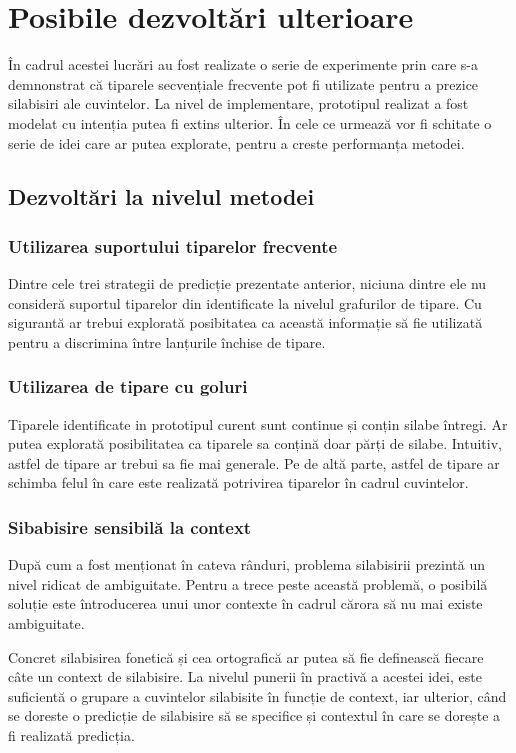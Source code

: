\chapter{Posibile dezvoltări ulterioare}

În cadrul acestei lucrări au fost realizate o serie de experimente prin care s-a demnonstrat că tiparele secvențiale frecvente pot fi utilizate pentru a prezice silabisiri ale cuvintelor. La nivel de implementare, prototipul realizat a fost modelat cu intenția putea fi extins ulterior. În cele ce urmează vor fi schitate o serie de idei care ar putea explorate, pentru a creste performanța metodei.


\section{Dezvoltări la nivelul metodei}

\subsection{Utilizarea suportului tiparelor frecvente}
Dintre cele trei strategii de predicție prezentate anterior, niciuna dintre ele nu consideră suportul tiparelor din identificate la nivelul grafurilor de tipare. Cu sigurantă ar trebui explorată posibitatea ca această informație să fie utilizată pentru a discrimina între lanțurile închise de tipare.

\subsection{Utilizarea de tipare cu goluri}
Tiparele identificate in prototipul curent sunt continue și conțin silabe întregi. Ar putea explorată posibilitatea ca tiparele sa conțină doar părți de silabe. Intuitiv, astfel de tipare ar trebui sa fie mai generale. 
Pe de altă parte, astfel de tipare ar schimba felul în care este realizată potrivirea tiparelor în cadrul cuvintelor.

\subsection{Sibabisire sensibilă la context}
După cum a fost menționat în cateva rânduri, problema silabisirii prezintă un nivel ridicat de ambiguitate. Pentru a trece peste această problemă, o posibilă soluție este întroducerea unui unor contexte în cadrul cărora să nu mai existe ambiguitate. 

Concret silabisirea fonetică și cea ortografică ar putea să fie definească fiecare câte un context de silabisire. La nivelul punerii în practivă a acestei idei, este suficientă o grupare a cuvintelor silabisite în funcție de context, iar ulterior, când se doreste o predicție de silabisire să se specifice și contextul în care se dorește a fi realizată predicția.

